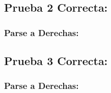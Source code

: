 \documentclass[a4paper, 12pt]{article}
\begin{document}
\subsection*{Prueba 2 Correcta:}

\subsubsection*{Parse a Derechas:}





\subsection*{Prueba 3 Correcta:}

\subsubsection*{Parse a Derechas:}



\end{document}
